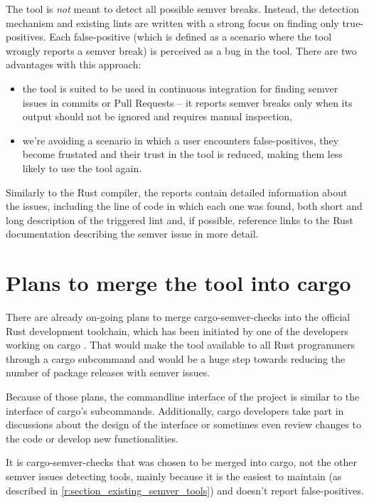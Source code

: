 \documentclass[licencjacka,en]{pracamgr}
\begin{document}
The tool is \textit{not} meant to detect all possible semver breaks.
Instead, the detection mechanism and existing lints are written
with a strong focus on finding only true-positives.
Each false-positive (which is defined as a scenario where the tool
wrongly reports a semver break) is perceived as a bug in the tool.
There are two advantages with this approach:
\begin{itemize}
	\item the tool is suited to be used in continuous integration
		for finding semver issues in commits or Pull Requests
		-- it reports semver breaks only when
		its output should not be ignored and requires manual inspection,
	\item we're avoiding a scenario in which
		a user encounters false-positives, they become frustated
		and their trust in the tool is reduced, making them
		less likely to use the tool again.
\end{itemize}

Similarly to the Rust compiler, the reports contain
detailed information about the issues, including
the line of code in which each one was found, both short and long description
of the triggered lint and, if possible, reference links to the Rust documentation
describing the semver issue in more detail.

\section{Plans to merge the tool into cargo}

There are already on-going plans to merge cargo-semver-checks into
the official Rust development toolchain,
which has been initiated by one of the developers working on cargo \cite{issue-merge-cargo}.
That would make the tool available to all Rust programmers
through a cargo subcommand and would be a huge step towards reducing the number of
package releases with semver issues.

Because of those plans, the commandline interface of the project is similar
to the interface of cargo's subcommands. Additionally, cargo developers
take part in discussions about the design of the interface \cite{issue-cli-interface}
or sometimes even review changes to the code or develop new functionalities.

It is cargo-semver-checks that was chosen to be merged into cargo,
not the other semver issues detecting tools,
mainly because it is the easiest to maintain
(as described in \ref{r:section_existing_semver_tools})
and doesn't report false-positives.
\end{document}
